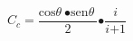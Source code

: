 \[C_c\mathrm{=}\frac{{\mathrm{cos} \theta \ }\mathrm{\bullet }{\mathrm{sen} \theta \ }}{\mathrm{2}}\mathrm{\bullet }\frac{i}{i\mathrm{+1}}\]